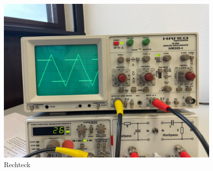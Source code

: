 \begin{figure}
  \centering
  \includegraphics[scale=0.1]{content/rechteckInt.png}
  \caption{Rechteck}
\end{figure}
